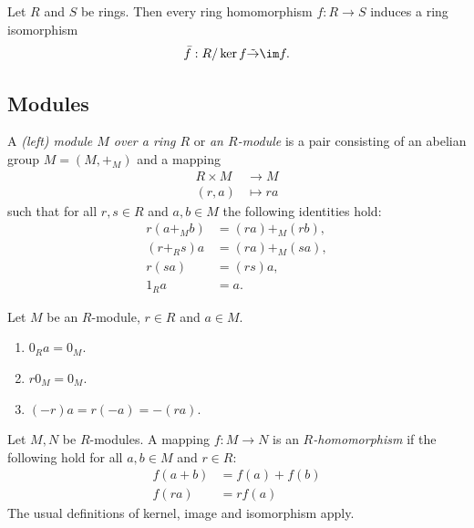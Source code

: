 \documentclass{article}
\begin{document}
\begin{theorem}
    Let $R$ and $S$ be rings. Then every ring homomorphism $f:R\to S$ induces a ring isomorphism
    \begin{align*}
        \bar f:R/\ker f \tilde\to \im f.
    \end{align*} 
\end{theorem}

\subsection{Modules}

\begin{definition}
    A \emph{(left) module $M$ over a ring $R$} or \emph{an $R$-module} is a pair consisting of an
    abelian group $M=(M,+_M)$ and a mapping 
    \begin{align*}
        R\times M &\to M\\
        (r,a) &\mapsto ra
    \end{align*}
    such that for all $r,s\in R$ and $a,b\in M$ the following identities hold:
    \begin{align*}
        r(a +_M b) &= (ra) +_M (rb),\\
        (r+_Rs)a &= (ra) +_M (sa),\\
        r(sa) &= (rs)a,\\
        1_Ra &= a.
    \end{align*}
\end{definition}

\begin{lemma}[Notes 3.7.8]
     Let $M$ be an $R$-module, $r\in R$ and $a\in M$. 
     \begin{enumerate}
         \item $0_Ra=0_M$.
         \item $r0_M=0_M$.
         \item $(-r)a=r(-a)=-(ra)$.
     \end{enumerate}
\end{lemma}

\begin{definition}
    Let $M,N$ be $R$-modules. A mapping $f:M\to N$ is an \emph{$R$-homomorphism} if the following 
    hold for all $a,b\in M$ and $r\in R$:
    \begin{align*}
        f(a+b) &= f(a) + f(b)\\
        f(ra) &= rf(a)
    \end{align*}
    The usual definitions of kernel, image and isomorphism apply.
\end{definition}
\end{document}
